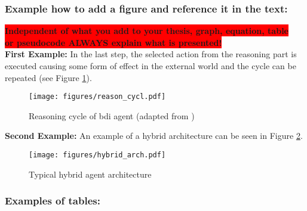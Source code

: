  
\subsubsection{Example how to add a figure and reference it in the text:}

\colorbox{red}{\textbf{Independent of what you add to your thesis, graph, equation, table}} \\
\colorbox{red}{\textbf{or pseudocode ALWAYS explain what is presented!}}
\\
 
\textbf{First Example:}
In the last step, the selected action from the reasoning part is executed causing some form of effect in the external world and the cycle can be repeated (see Figure \ref{reasoning}).

\begin{figure}[H]
	\centering
  \texttt{[image: figures/reason\_cycl.pdf]}
	\caption{Reasoning cycle of \gls{bdi} agent (adapted from \cite{bremner2019})}
	\label{reasoning}
\end{figure} 


\textbf{Second Example:}
An example of a hybrid architecture can be seen in Figure \ref{hybride_arch}.
\begin{figure}[ht]
	\centering
  \texttt{[image: figures/hybrid\_arch.pdf]}
	\caption{Typical hybrid agent architecture \citep{dennis2016}}
	\label{hybride_arch}
\end{figure}



\subsubsection{Examples of tables:}

